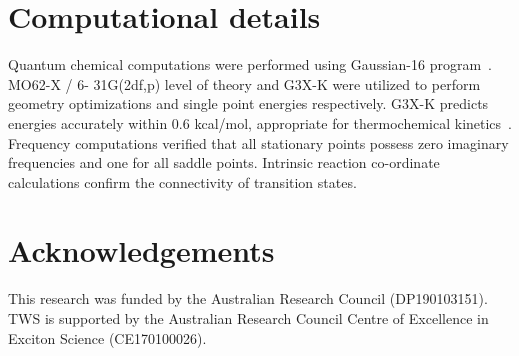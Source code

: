 \documentclass[journal=jacsat,manuscript=article,layout=onecolumn]{achemso}
\begin{document}
\section{Computational details}
Quantum chemical computations were performed using Gaussian-16 program~\cite{g16}. MO62-X / 6- 31G(2df,p) level of theory and G3X-K were utilized to perform geometry optimizations and single point energies respectively. G3X-K predicts energies accurately within 0.6 kcal/mol, appropriate for thermochemical kinetics~\cite{das13}. Frequency computations verified that all stationary points possess zero imaginary frequencies and one for all saddle points. Intrinsic reaction co-ordinate calculations confirm the connectivity of transition states.

\section{Acknowledgements}
This research was funded by the Australian Research Council (DP190103151). TWS is supported by the Australian Research Council Centre of Excellence in Exciton Science (CE170100026).





\end{document}
